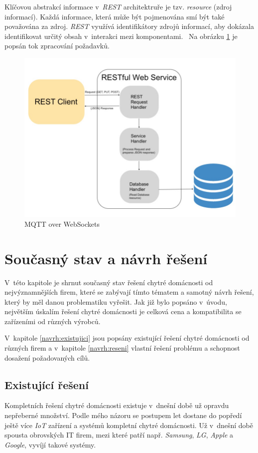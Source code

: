 Klíčovou abstrakcí informace v~\emph{REST} architektruře je tzv. \emph{resource} (zdroj informací).
Každá informace, která může být pojmenována smí být také považována za zdroj.
\emph{REST} využívá identifikátory zdrojů informací, aby dokázala identifikovat určitý obsah v~interakci mezi komponentami.~\cite{restful:info}
Na obrázku \ref{figure:restful} je popsán tok zpracování požadavků.

\begin{figure}[ht]
  \centering
  \includegraphics[width=.59 \linewidth]{obrazky-figures/restful.jpg}
  \caption{MQTT over WebSockets}
  \label{figure:restful}
\end{figure}

\chapter{Současný stav a návrh řešení}
\label{navrh}

V~této kapitole je shrnut současný stav řešení chytré domácnosti od nejvýznamnějších firem, které se zabývají tímto tématem a samotný návrh řešení, který by měl danou problematiku vyřešit.
Jak již bylo popsáno v~úvodu, největším úskalím řešení chytré domácnosti je celková cena a kompatibilita se zařízeními od různých výrobců.

V~kapitole \ref{navrh:existujici} jsou popsány existující řešení chytré domácnosti od různých firem a v~kapitole \ref{navrh:reseni} vlastní řešení problému a schopnost dosažení požadovaných cílů.

\section*{Existující řešení}
\label{navrh:existujici}

Kompletních řešení chytré domácnosti existuje v~dnešní době už opravdu nepřeberné množství. Podle mého názoru se postupem let dostane do popředí ještě více \emph{IoT} zařízení a systémů kompletní chytré domácnosti.
Už v~dnešní době spousta obrovských IT firem, mezi které patří např. \emph{Samsung}, \emph{LG}, \emph{Apple} a \emph{Google}, vyvíjí takové systémy.

